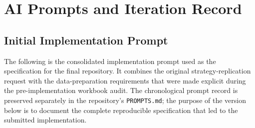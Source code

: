 \documentclass{article}
\begin{document}
\clearpage
\appendix
\section{AI Prompts and Iteration Record}
\label{app:prompts}

\subsection{Initial Implementation Prompt}

The following is the consolidated implementation prompt used as the specification for the final repository. It combines the original strategy-replication request with the data-preparation requirements that were made explicit during the pre-implementation workbook audit. The chronological prompt record is preserved separately in the repository's \texttt{PROMPTS.md}; the purpose of the version below is to document the complete reproducible specification that led to the submitted implementation.
\end{document}
